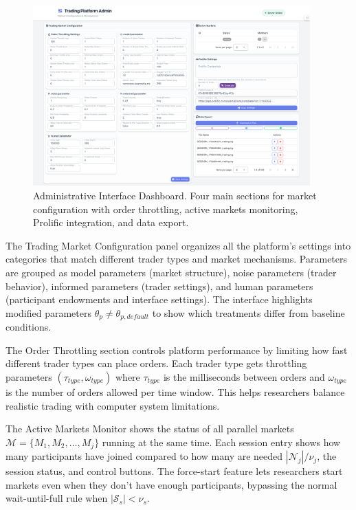 \begin{figure}[!htbp]
\centering
\includegraphics[width=0.95\textwidth]{figs/admin-page.png}
\caption{Administrative Interface Dashboard. Four main sections for market configuration with order throttling, active markets monitoring, Prolific integration, and data export.}
\label{fig:admin}
\end{figure}

The Trading Market Configuration panel organizes all the platform's settings into categories that match different trader types and market mechanisms. Parameters are grouped as model parameters (market structure), noise parameters (trader behavior), informed parameters (trader settings), and human parameters (participant endowments and interface settings). The interface highlights modified parameters $\theta_p \neq \theta_{p,default}$ to show which treatments differ from baseline conditions.

The Order Throttling section controls platform performance by limiting how fast different trader types can place orders. Each trader type gets throttling parameters $(\tau_{type}, \omega_{type})$ where $\tau_{type}$ is the milliseconds between orders and $\omega_{type}$ is the number of orders allowed per time window. This helps researchers balance realistic trading with computer system limitations.

The Active Markets Monitor shows the status of all parallel markets $\mathcal{M} = \{M_1, M_2, \ldots, M_j\}$ running at the same time. Each session entry shows how many participants have joined compared to how many are needed $|\mathcal{N}_j|/\nu_j$, the session status, and control buttons. The force-start feature lets researchers start markets even when they don't have enough participants, bypassing the normal wait-until-full rule when $|\mathcal{S}_s| < \nu_s$.

